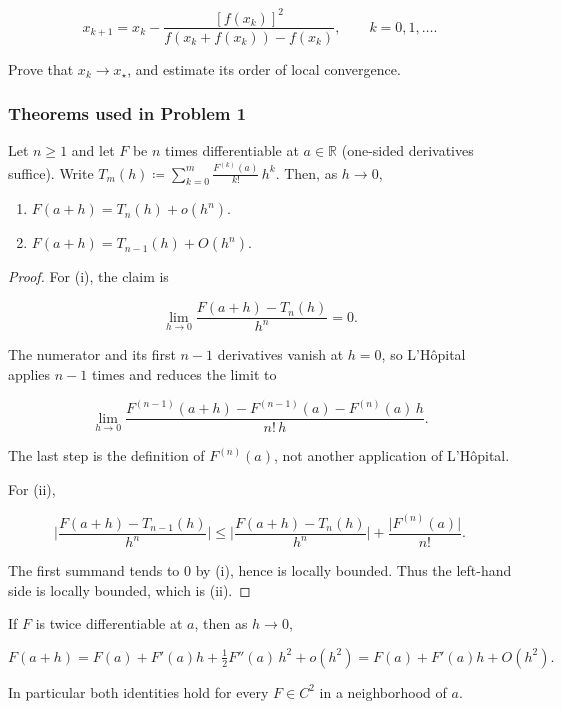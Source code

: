 \documentclass[11pt,a4paper]{article}
\begin{document}
\[
x_{k+1} = x_{k} - \frac{[f(x_{k})]^{2}}{f(x_{k} + f(x_{k})) - f(x_{k})},\qquad k = 0, 1, \dots.
\]

Prove that \(x_{k} \to x_{\star}\), and estimate its order of local convergence.

\setcounter{section}{1}

\subsubsection{Theorems used in Problem 1}

\begin{theorem}
\label{thm:peano}
Let \(n\ge 1\) and let \(F\) be \(n\) times differentiable at \(a\in\mathbb{R}\) (one-sided derivatives suffice). Write \(T_{m}(h)\coloneqq\sum_{k=0}^{m}\frac{F^{(k)}(a)}{k!}\,h^{k}\). Then, as \(h\to 0\),

\begin{enumerate}[label=\textup{(\roman*)}]
    \item
    \(F(a+h)=T_{n}(h)+o(h^{n})\).

    \item
    \(F(a+h)=T_{n-1}(h)+O(h^{n})\).
\end{enumerate}
\end{theorem}

\begin{proof}
For (i), the claim is

\[
\lim_{h\to 0}
\frac{F(a+h)-T_{n}(h)}{h^{n}}
=
0.
\]

The numerator and its first \(n-1\) derivatives vanish at \(h=0\), so L'H\^{o}pital applies \(n-1\) times and reduces the limit to

\[
\lim_{h\to 0}
\frac{F^{(n-1)}(a+h)-F^{(n-1)}(a)-F^{(n)}(a)\,h}{n!\,h}.
\]

The last step is the definition of \(F^{(n)}(a)\), not another application of L'H\^{o}pital.

For (ii),

\[
\biggl|
\frac{F(a+h)-T_{n-1}(h)}{h^{n}}
\biggr|
\le
\biggl|
\frac{F(a+h)-T_{n}(h)}{h^{n}}
\biggr|
+
\frac{\bigl|F^{(n)}(a)\bigr|}{n!}.
\]

The first summand tends to \(0\) by (i), hence is locally bounded. Thus the left-hand side is locally bounded, which is (ii).
\end{proof}

\begin{corollary}[\(C^{2}\) expansions]
\label{cor:c2-peano}
If \(F\) is twice differentiable at \(a\), then as \(h\to 0\),

\begin{equation}
\label{eq:c2-peano}
F(a+h)
=
F(a)+F'(a)h+\tfrac12 F''(a)\,h^{2}+o(h^{2})
=
F(a)+F'(a)h+O(h^{2}).
\end{equation}

In particular both identities hold for every \(F\in C^{2}\) in a neighborhood of \(a\).
\end{corollary}
\end{document}
